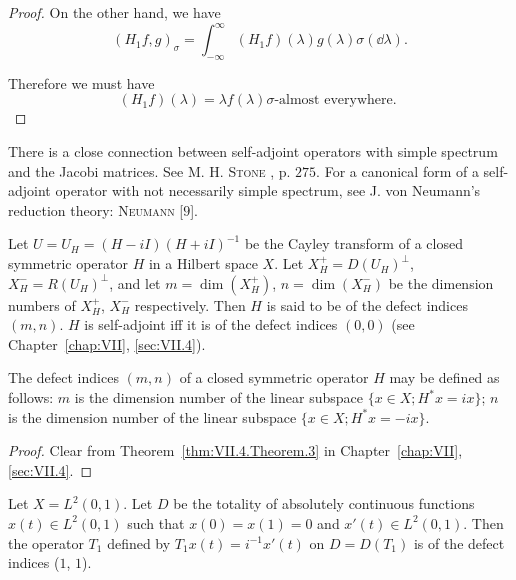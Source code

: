 \begin{proof}
On the other hand, we have 
\[
(H _{1} f, g) _{\sigma} = \int_{- \infty} ^{\infty} (H _{1} f) (\lambda) g (\lambda) \sigma (\dd \lambda).
\]

Therefore we must have 
\[
(H _{1} f) (\lambda) = \lambda f (\lambda) \sigma \text{-almost everywhere. }
\]
\end{proof}

\begin{remarku} There is a close connection between self-adjoint operators with simple spectrum and the Jacobi matrices. See M. H. \textsc{Stone} \cite{stone311}, p. $275$. For a canonical form of a self-adjoint operator with not necessarily simple spectrum, see J. von Neumann's reduction theory: \textsc{Neumann} [$9$]. 
\end{remarku}


\label{sec:XI.15}

\begin{definition}\label{def:XI.15.Definition.1} Let $U = U_H = (H - iI)(H + iI)^{-1}$ be the Cayley transform of a closed symmetric operator $H$ in a Hilbert space $X$. Let $X_H^+ = D(U_H)^\perp$, $X_H^- = R(U_H)^\perp$, and let $m = \dim(X_H^+)$, $n = \dim(X_H^-)$ be the dimension numbers of $X_H^+$, $X_H^-$ respectively. Then $H$ is said to be of the defect indices $(m, n)$. $H$ is self-adjoint iff it is of the defect indices $(0, 0)$ (see Chapter~\ref{chap:VII}, \ref{sec:VII.4}). 
\end{definition}

\begin{proposition}\label{prop:XI.15.Proposition.1} The defect indices $(m, n)$ of a closed symmetric operator $H$ may be defined as follows: $m$ is the dimension number of the linear subspace $\{x \in X; H^{*}x = ix\}$; $n$ is the dimension number of the linear subspace $\{x \in X; H^{*}x = -ix\}$. 
\end{proposition}

\begin{proof}
 Clear from Theorem~\ref{thm:VII.4.Theorem.3} in Chapter~\ref{chap:VII}, \ref{sec:VII.4}. 
\end{proof}

\begin{example}\label{ex:XI.15.Example.1} Let $X = L^2(0,1)$. Let $D$ be the totality of absolutely continuous functions $x(t) \in L^2(0,1)$ such that $x(0) = x(1) = 0$ and $x'(t) \in L^2(0,1)$. Then the operator $T_1$ defined by $T_1x(t) = i^{-1}x'(t)$ on $D = D(T_1)$ is of the defect indices ($1$, $1$). 
\end{example}

